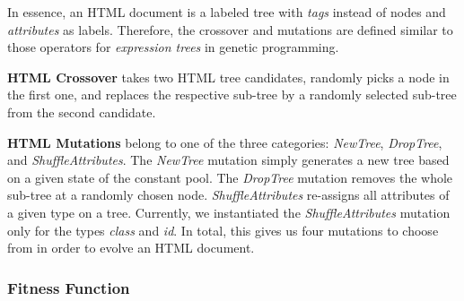 In essence, an HTML document is a labeled tree with \emph{tags} instead of nodes and \emph{attributes} as labels. Therefore, the crossover and mutations are defined similar to those operators for \emph{expression trees} in genetic programming.

\textbf{HTML Crossover} takes two HTML tree candidates, randomly picks a node in the first one, and replaces the respective sub-tree by a randomly selected sub-tree from the second candidate.

\textbf{HTML Mutations} belong to one of the three categories: \emph{NewTree}, \emph{DropTree}, and \emph{ShuffleAttributes}. The \emph{NewTree} mutation simply generates a new tree based on a given state of the constant pool. The \emph{DropTree} mutation removes the whole sub-tree at a randomly chosen node. \emph{ShuffleAttributes} re-assigns all attributes of a given type on a tree. Currently, we instantiated the \emph{ShuffleAttributes} mutation only for the types \emph{class} and \emph{id}. In total, this gives us four mutations to choose from in order to evolve an HTML document.

\subsubsection{Fitness Function}
\label{sub.sub.sec.fitness.fun}

